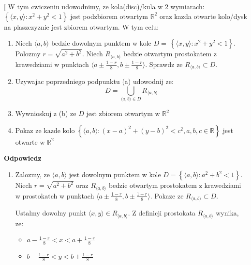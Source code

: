 \documentclass{article}
\makeatletter
\def\myitem{%
   \@ifnextchar[ \@myitem{\@noitemargtrue\@myitem[\@itemlabel]}}
\def\@myitem[#1]{\item[#1]\mbox{}\\}
\makeatother
\begin{document}
\begin{enumerate}[align=left] %
        \renewcommand{\labelenumi}{\textbf{Cwiczenie 2.2.\arabic{enumi}}}
        
        \myitem W tym cwiczeniu udowodnimy, ze kola(disc)/kula w 2 wymiarach: $\left\{\langle x,y \rangle: x^{2} + y^{2} < 1  \right\}$ jest podzbiorem otwartym ${\mathbb{R}}^2$ oraz kazda otwarte kolo/dysk na plaszczyznie jest zbiorem otwartym.
        \hfill\newline W tym celu:

         \begin{enumerate} 
                \item Niech $\langle a,b \rangle$ bedzie dowolnym punktem w kole $D = \ \left\{\langle x,y \rangle : x^{2} + y^{2} < 1  \right\}$. Polozmy $r = \sqrt{a^{2} + b^{2}}$. Niech $R_{\langle a,b \rangle}$ bedzie otwartym prostokatem z krawedziami w punktach $\langle a \pm \frac{1-r}{8}, b \pm \frac{1-r}{8} \rangle$. Sprawdz ze $R_{\langle a,b \rangle} \subset D$.
                 \item Uzywajac poprzedniego podpunktu (a) udowodnij ze:
                     $$D = \bigcup\limits_{\langle a, b \rangle \in D} R_{\langle a,b \rangle}$$
                 \item Wywnioskuj z (b) ze $D$ jest zbiorem otwartym w ${\mathbb{R}}^{2}$
                 \item Pokaz ze kazde kolo $\left\{ \langle a,b \rangle : (x-a)^{2} + (y-b)^{2}< c^{2}, a,b,c \in \mathbb{R}   \right\}$ jest otwarte w ${\mathbb{R}}^{2}$
        \end{enumerate}

        \textbf{Odpowiedz}

        \begin{enumerate}

            \item Zalozmy, ze $\langle a, b\rangle$ jest dowolnym punktem w kole $D = \left\{ \langle a,b \rangle : a^{2} + b^{2} < 1  \right\}$. Niech $r = \sqrt{a^{2} + b^{2}}$ oraz $R_{\langle a,b \rangle}$ bedzie otwartym prostokatem z krawedziami w prostokatch w punktach $\langle a \pm \frac{1-r}{8}, b \pm \frac{1-r}{8} \rangle$. Pokaze ze $R_{\langle a,b \rangle} \subset D$.

        Ustalmy dowolny punkt $\langle x,y \rangle \in R_{\langle a,b \rangle}$. Z definicji prostokata $R_{\langle a,b \rangle}$ wynika, ze:
                \begin{itemize}
                    \item $a - \frac{1-r}{8} < x < a + \frac{1-r}{8}$
                    \item $b - \frac{1-r}{8} < y < b + \frac{1-r}{8}$ 
                \end{itemize}
    

\end{enumerate}
\end{enumerate}
\end{document}
